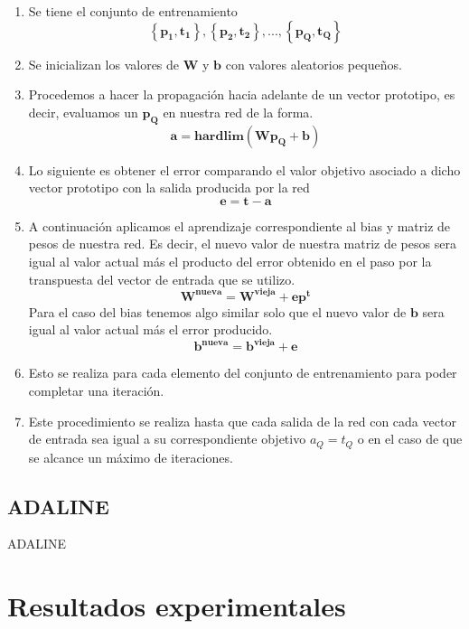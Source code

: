 \documentclass[12pt, titlepage]{article}
\begin{document}
        \begin{enumerate}
            \item Se tiene el conjunto de entrenamiento
            \[ \left\lbrace \boldsymbol{p_1, t_1}\right\rbrace , \left\lbrace \boldsymbol{p_2, t_2}\right\rbrace , ... , \left\lbrace \boldsymbol{p_Q, t_Q}\right\rbrace\]
            \item Se inicializan los valores de $\boldsymbol{W}$ y $\boldsymbol{b}$ con valores aleatorios pequeños.
            \item Procedemos a hacer la propagación hacia adelante de un vector prototipo, es decir, evaluamos un $\boldsymbol{p_Q}$ en nuestra red de la forma.
            \[ \boldsymbol{a = hardlim(Wp_Q+b)} \]
            \item Lo siguiente es obtener el error comparando el valor objetivo asociado a dicho vector prototipo con la salida producida por la red
            \[ \boldsymbol{e=t-a} \]
            \item A continuación aplicamos el aprendizaje correspondiente al bias y matriz de pesos de nuestra red. Es decir, el nuevo valor de nuestra matriz de pesos sera igual al valor actual más el producto del error obtenido en el paso por la transpuesta del vector de entrada que se utilizo.
            \[ \boldsymbol{W^{nueva} = W^{vieja} + ep^{t}} \]
            Para el caso del bias tenemos algo similar solo que el nuevo valor de $\boldsymbol{b}$ sera igual al valor actual más el error producido.
            \[ \boldsymbol{b^{nueva} = b^{vieja} + e} \]
            \item Esto se realiza para cada elemento del conjunto de entrenamiento para poder completar una iteración.
            \item Este procedimiento se realiza hasta que cada salida de la red con cada vector de entrada sea igual a su correspondiente objetivo $a_Q = t_Q$ o en el caso de que se alcance un máximo de iteraciones.
        \end{enumerate}
        \subsection{ADALINE}
        ADALINE\cite{pagina}
    \section{Resultados experimentales}
\end{document}
